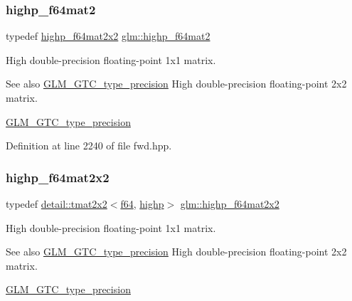 \subsubsection{\texorpdfstring{highp\+\_\+f64mat2}{highp\_f64mat2}}
{\footnotesize\ttfamily typedef \hyperlink{group__gtc__type__precision_ga4babca568fc88f185620c02e4fdac0d8}{highp\+\_\+f64mat2x2} \hyperlink{group__gtc__type__precision_ga7d9fd446fd43310ba6f63c8f9468acc0}{glm\+::highp\+\_\+f64mat2}}

High double-\/precision floating-\/point 1x1 matrix. \begin{DoxySeeAlso}{See also}
\hyperlink{group__gtc__type__precision}{G\+L\+M\+\_\+\+G\+T\+C\+\_\+type\+\_\+precision} High double-\/precision floating-\/point 2x2 matrix. 

\hyperlink{group__gtc__type__precision}{G\+L\+M\+\_\+\+G\+T\+C\+\_\+type\+\_\+precision} 
\end{DoxySeeAlso}


Definition at line 2240 of file fwd.\+hpp.

\mbox{\label{group__gtc__type__precision_ga4babca568fc88f185620c02e4fdac0d8}} 
\subsubsection{\texorpdfstring{highp\+\_\+f64mat2x2}{highp\_f64mat2x2}}
{\footnotesize\ttfamily typedef \hyperlink{structglm_1_1detail_1_1tmat2x2}{detail\+::tmat2x2}$<$\hyperlink{group__gtc__type__precision_ga2bba392e555124b36cde6abba349bab3}{f64}, \hyperlink{namespaceglm_a0f04f086094c747d227af4425893f545ac6f7eab42eacbb10d59a58e95e362074}{highp}$>$ \hyperlink{group__gtc__type__precision_ga4babca568fc88f185620c02e4fdac0d8}{glm\+::highp\+\_\+f64mat2x2}}

High double-\/precision floating-\/point 1x1 matrix. \begin{DoxySeeAlso}{See also}
\hyperlink{group__gtc__type__precision}{G\+L\+M\+\_\+\+G\+T\+C\+\_\+type\+\_\+precision} High double-\/precision floating-\/point 2x2 matrix. 

\hyperlink{group__gtc__type__precision}{G\+L\+M\+\_\+\+G\+T\+C\+\_\+type\+\_\+precision} 
\end{DoxySeeAlso}


